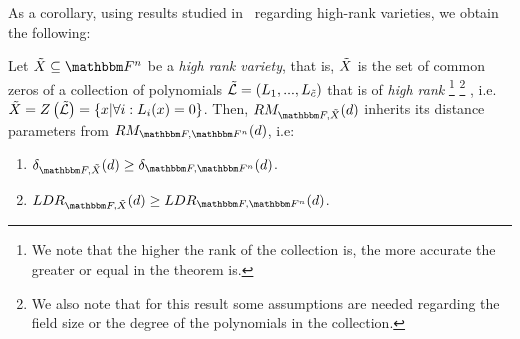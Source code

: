 As a corollary, using results studied in~\cite{kazhdan2018polynomial, kazhdan2019extendingweaklypolynomialfunctions, lampert2021relative} regarding high-rank varieties, we obtain the following:
\begin{corollary*}
    Let $\variety \subseteq \field$ be a \emph{high rank variety},
    that is, ${\tilde{X}}$ is the set of common zeros of a collection of polynomials $\varpolyset = (\varpoly_1,...,\varpoly_{\varietypolycount})$
    that is of \emph{high rank}
    \footnote{We note that the higher the rank of the collection is, the more accurate the greater or equal in the theorem is.}
    \footnote{We also note that for this result some assumptions are needed regarding the field size or the degree of the polynomials in the collection.}
    , i.e. $\variety = \zerofunc{\varpolyset} = \set{x \suchthat \forall i: \varpoly_i(x) = 0}$.
    \newline
    Then, $\reedmullercodeex{\basefield}{\variety}{\degree}$ inherits its distance parameters from $\reedmullercodeex{\basefield}{\field}{\degree}$, i.e:
    \begin{enumerate}
        \item $\normalizedcodedistanceex{\basefield}{\variety}{\degree} \geq \normalizedcodedistanceex{\basefield}{\field}{\degree}$.
        \item $\listdecodingradiusex{\basefield}{\variety}{\degree} \geq \listdecodingradiusex{\basefield}{\field}{\degree}$.
    \end{enumerate}
\end{corollary*}

